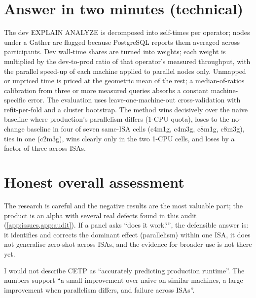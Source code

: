 \section{Answer in two minutes (technical)}
The dev EXPLAIN ANALYZE is decomposed into self-times per operator; nodes under a Gather are flagged because PostgreSQL reports them averaged across participants. Dev wall-time shares are turned into weights; each weight is multiplied by the dev-to-prod ratio of that operator's measured throughput, with the parallel speed-up of each machine applied to parallel nodes only. Unmapped or unpriced time is priced at the geometric mean of the rest; a median-of-ratios calibration from three or more measured queries absorbs a constant machine-specific error. The evaluation uses leave-one-machine-out cross-validation with refit-per-fold and a cluster bootstrap. The method wins decisively over the naive baseline where production's parallelism differs (1-CPU quota), loses to the no-change baseline in four of seven same-ISA cells (c4m1g, c4m3g, c8m1g, c8m3g), ties in one (c2m3g), wins clearly only in the two 1-CPU cells, and loses by a factor of three across ISAs.

\section{Honest overall assessment}
The research is careful and the negative results are the most valuable part; the product is an alpha with several real defects found in this audit (\cref{app:issues,app:audit}). If a panel asks ``does it work?'', the defensible answer is: it identifies and corrects the dominant effect (parallelism) within one ISA, it does not generalise zero-shot across ISAs, and the evidence for broader use is not there yet.
\begin{honest}
I would not describe CETP as ``accurately predicting production runtime''. The numbers support ``a small improvement over naive on similar machines, a large improvement when parallelism differs, and failure across ISAs''.
\end{honest}
